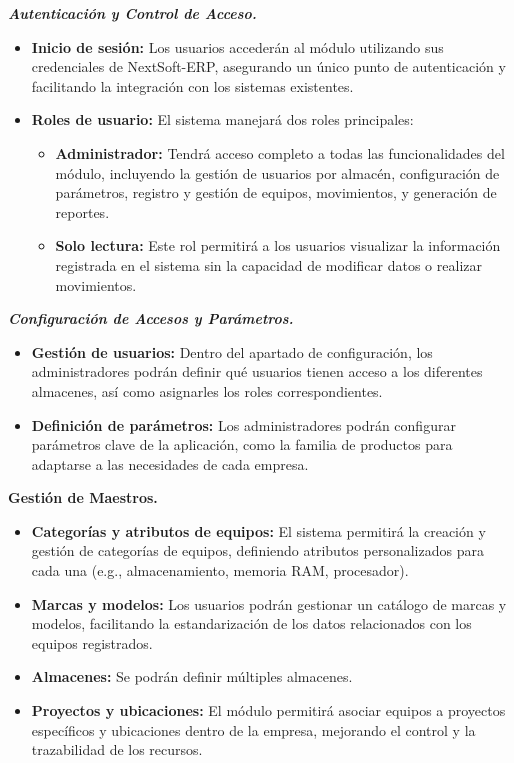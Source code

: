 \documentclass[stu, 12pt, letterpaper, donotrepeattitle, floatsintext, natbib]{apa7}
\begin{document}
\textit{\textbf{Autenticación y Control de Acceso.}}
\begin{itemize}
    \item\textbf{Inicio de sesión: }Los usuarios accederán al módulo utilizando sus credenciales de NextSoft-ERP, asegurando un único punto de
          autenticación y facilitando la integración con los sistemas existentes.
    \item\textbf{Roles de usuario: }El sistema manejará dos roles principales:
          \begin{itemize}
              \item\textbf{Administrador: }Tendrá acceso completo a todas las funcionalidades del módulo, incluyendo la gestión de usuarios
                    por almacén, configuración de parámetros, registro y gestión de equipos, movimientos, y generación de reportes.
              \item\textbf{Solo lectura: }Este rol permitirá a los usuarios visualizar la información registrada en el sistema sin la capacidad
                    de modificar datos o realizar movimientos.
          \end{itemize}
\end{itemize}

\textit{\textbf{Configuración de Accesos y Parámetros.}}
\begin{itemize}
    \item\textbf{Gestión de usuarios: }Dentro del apartado de configuración, los administradores podrán definir qué usuarios tienen acceso a
          los diferentes almacenes, así como asignarles los roles correspondientes.
    \item\textbf{Definición de parámetros: }Los administradores podrán configurar parámetros clave de la aplicación, como la familia de
          productos para adaptarse a las necesidades de cada empresa.
\end{itemize}

\textbf{Gestión de Maestros.}
\begin{itemize}
    \item\textbf{Categorías y atributos de equipos: }El sistema permitirá la creación y gestión de categorías de equipos, definiendo atributos
          personalizados para cada una (e.g., almacenamiento, memoria RAM, procesador).
    \item\textbf{Marcas y modelos: }Los usuarios podrán gestionar un catálogo de marcas y modelos, facilitando la estandarización de los datos
          relacionados con los equipos registrados.
    \item\textbf{Almacenes: }Se podrán definir múltiples almacenes.
    \item\textbf{Proyectos y ubicaciones: }El módulo permitirá asociar equipos a proyectos específicos y ubicaciones dentro de la empresa,
          mejorando el control y la trazabilidad de los recursos.
\end{itemize}
\end{document}
